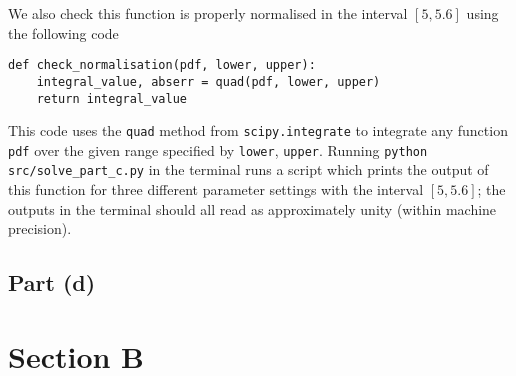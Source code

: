 \documentclass[12pt]{article}
\begin{document}
We also check this function is properly normalised in the interval $[5, 5.6]$ using the following code

\begin{lstlisting}[caption=Function checking the normalisation of the pdf for part (c).,]
def check_normalisation(pdf, lower, upper):
    integral_value, abserr = quad(pdf, lower, upper)
    return integral_value
\end{lstlisting}

This code uses the \texttt{quad} method from \texttt{scipy.integrate} to integrate any function \texttt{pdf} over the given range specified by \texttt{lower}, \texttt{upper}.
Running \texttt{python src/solve_part\_c.py} in the terminal runs a script which prints the output of this function for three different parameter settings with the interval $[5, 5.6]$; the outputs in the terminal should all read as approximately unity (within machine precision).

\subsection*{Part (d)}

\section*{Section B}
\end{document}
